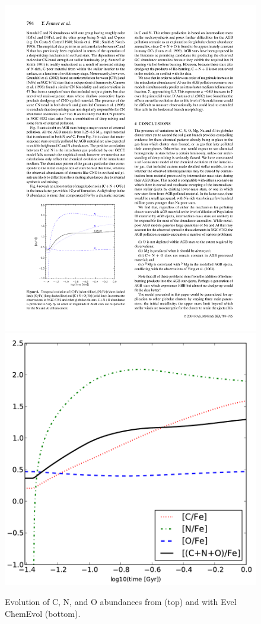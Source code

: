 \begin{figure}
 \begin{center}\includegraphics[height=0.45\textheight]{figures/Fenner04-CNO}\\
  \includegraphics[height=0.45\textheight]{figures/cemodel-CNO}\end{center}
 \caption{Evolution of C, N, and O abundances from \citet{Fenner:2004ju} (top) and with Evel ChemEvol (bottom).}\label{fig:cemodel-cno}
\end{figure}

